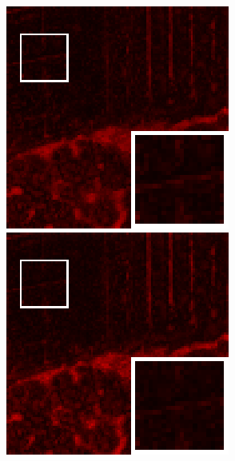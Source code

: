 \begin{figure}[t]
\begin{center}
\begin{minipage}{0.15\hsize}
		\end{minipage}
		\begin{minipage}{0.15\hsize}
			\centerline{\includegraphics[width=\hsize]{./fig_supplement/SAM_map_color_woboundary/Beltsville/sam_map_HSSTV_L12.eps}} %
		\end{minipage}
		\begin{minipage}{0.15\hsize}
			\centerline{\includegraphics[width=\hsize]{./fig_supplement/SAM_map_color_woboundary/Beltsville/sam_map_l0l1HTV.eps}} %

\end{minipage}
\end{center}
\end{figure}
